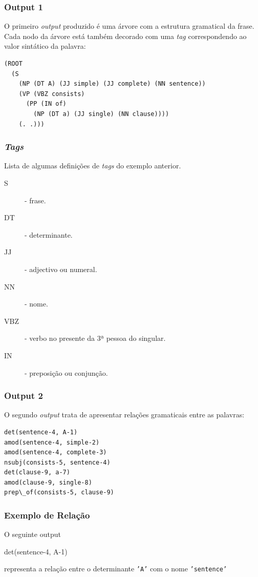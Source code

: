 \documentclass{beamer}
\begin{document}
\begin{frame}[fragile]\frametitle{Output 1}
O primeiro \emph{output} produzido é uma árvore com a estrutura gramatical da frase. Cada nodo da árvore está também decorado com
uma \emph{tag} correspondendo ao valor sintático da palavra:

\begin{lstlisting}[language=perl_u,breaklines=true]
 (ROOT
  (S
    (NP (DT A) (JJ simple) (JJ complete) (NN sentence))
    (VP (VBZ consists)
      (PP (IN of)
        (NP (DT a) (JJ single) (NN clause))))
    (. .)))
\end{lstlisting}

\end{frame}

\begin{frame}\frametitle{\emph{Tags}}
Lista de algumas definições de \emph{tags} do exemplo anterior.\\
 \begin{description}
  \item [S] - frase.
  \item [DT] - determinante.
  \item [JJ] - adjectivo ou numeral.
  \item [NN] - nome.
  \item [VBZ] - verbo no presente da 3ª pessoa do singular.
  \item [IN] - preposição ou conjunção.
 \end{description}
\end{frame}

\begin{frame}[fragile]\frametitle{Output 2}
 O segundo \emph{output} trata de apresentar relações gramaticais entre as palavras:
\begin{lstlisting}[language=perl_u,breaklines=true]
det(sentence-4, A-1)
amod(sentence-4, simple-2)
amod(sentence-4, complete-3)
nsubj(consists-5, sentence-4)
det(clause-9, a-7)
amod(clause-9, single-8)
prep\_of(consists-5, clause-9)
\end{lstlisting}

\end{frame}

\begin{frame}\frametitle{Exemplo de Relação}
  O seguinte output
 \begin{block}{}
  det(sentence-4, A-1)
 \end{block}
  representa a relação entre o determinante \texttt{'A'} com o nome \texttt{'sentence'}

\end{frame}
\end{document}
